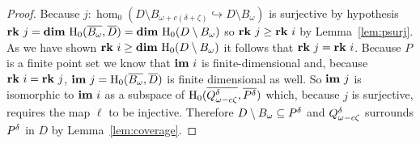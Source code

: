 \begin{proof}
  Because $j : \hom_0(D\setminus B_{\omega+c(\delta+\zeta)}\hookrightarrow D\setminus B_\omega)$ is surjective by hypothesis $\mathbf{rk}~j = \mathbf{dim}~\mathrm{H}_0(\overline{B_{\omega}},\overline{D}) = \mathbf{dim}~\mathrm{H}_0(D\setminus B_\omega)$ so $\mathbf{rk}~j\geq \mathbf{rk}~i$ by Lemma~\ref{lem:psurj}.
  As we have shown $\mathbf{rk}~i\geq \mathbf{dim}~\mathrm{H}_0(D\setminus B_\omega)$ it follows that $\mathbf{rk}~j = \mathbf{rk}~i$.
  Because $P$ is a finite point set we know that $\mathbf{im}~i$ is finite-dimensional and, because $\mathbf{rk}~i = \mathbf{rk}~j$, $\mathbf{im}~j=\mathrm{H}_0(\overline{B_{\omega}}, \overline{D})$ is finite dimensional as well.
  So $\mathbf{im}~j$ is isomorphic to $\mathbf{im}~i$ as a subspace of $\mathrm{H}_0(\overline{Q_{\omega - c\zeta}^{\delta}}, \overline{P^{\delta}})$ which, because $j$ is surjective, requires the map $\ell$ to be injective.
  Therefore $D\setminus B_\omega\subseteq P^{\delta}$ and $Q_{\omega - c\zeta}^{\delta}$ surrounds $P^{\delta}$ in $D$ by Lemma~\ref{lem:coverage}.
\end{proof}
